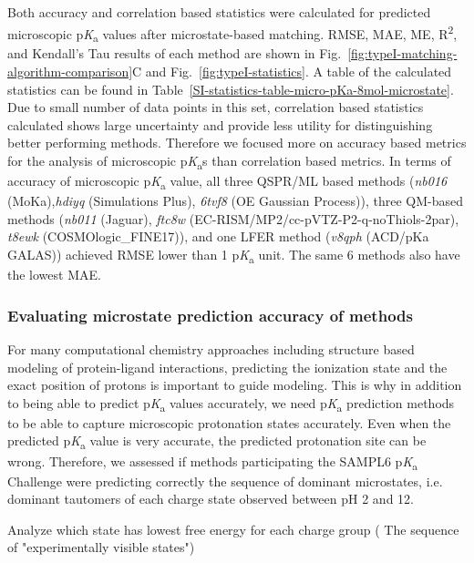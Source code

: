 \documentclass[9pt,lineno,final]{elife}
\newcommand{\pKa}{p\textit{K}\textsubscript{a}}
\begin{document}
Both accuracy and correlation based statistics were calculated for predicted microscopic \pKa{} values after microstate-based matching. RMSE, MAE, ME, R\textsuperscript{2}, and Kendall's Tau results of each method are shown in Fig.~\ref{fig:typeI-matching-algorithm-comparison}C and Fig.~\ref{fig:typeI-statistics}. A table of the calculated statistics can be found in Table~\ref{SI-statistics-table-micro-pKa-8mol-microstate}. Due to small number of data points in this set, correlation based statistics calculated shows large uncertainty and provide less utility for distinguishing better performing methods. Therefore we focused more on accuracy based metrics for the analysis of microscopic \pKa{}s than correlation based metrics. In terms of accuracy of microscopic \pKa{} value, all three QSPR/ML based methods (\textit{nb016} (MoKa),\textit{hdiyq} (Simulations Plus), \textit{6tvf8} (OE Gaussian Process)), three QM-based methods (\textit{nb011} (Jaguar), \textit{ftc8w} (EC-RISM/MP2/cc-pVTZ-P2-q-noThiols-2par), \textit{t8ewk} (COSMOlogic\_FINE17)), and one LFER method (\textit{v8qph} (ACD/pKa GALAS)) achieved RMSE lower than 1 \pKa{} unit. The same 6 methods also have the lowest MAE.


\subsubsection{Evaluating microstate prediction accuracy of methods}

For many computational chemistry approaches including structure based modeling of protein-ligand interactions, predicting the ionization state and the exact position of protons is important to guide modeling.  
This is why in addition to being able to predict \pKa{} values accurately, we need \pKa{} prediction methods to be able to capture microscopic protonation states accurately. Even when the predicted \pKa{} value is very accurate, the predicted protonation site can be wrong. 
Therefore, we assessed if methods participating the SAMPL6 \pKa{} Challenge were predicting correctly the sequence of dominant microstates, i.e. dominant tautomers of each charge state observed between pH 2 and 12.


 Analyze which state has lowest free energy for each charge group ( The sequence of "experimentally visible states")
 
\end{document}
